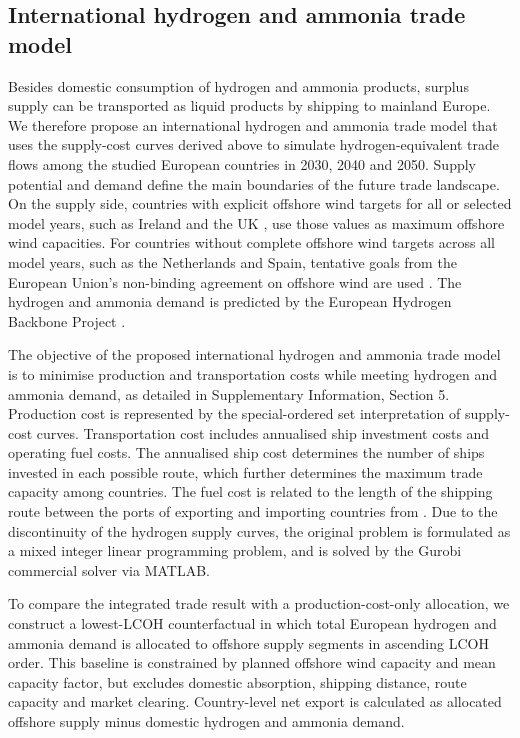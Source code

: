 \documentclass[pdflatex,lineno,sn-mathphys,Numbered]{sn-jnl}%
\begin{document}
\subsection{International hydrogen and ammonia trade model}
Besides domestic consumption of hydrogen and ammonia products, surplus supply can be transported as liquid products by shipping to mainland Europe. We therefore propose an international hydrogen and ammonia trade model that uses the supply-cost curves derived above to simulate hydrogen-equivalent trade flows among the studied European countries in 2030, 2040 and 2050. Supply potential and demand define the main boundaries of the future trade landscape. On the supply side, countries with explicit offshore wind targets for all or selected model years, such as Ireland \cite{FutureFrameworkforOffshore} and the UK \cite{Offshorewindnet}, use those values as maximum offshore wind capacities. For countries without complete offshore wind targets across all model years, such as the Netherlands and Spain, tentative goals from the European Union's non-binding agreement on offshore wind are used \cite{Offshorerenewableenergy}.
The hydrogen and ammonia demand is predicted by the European Hydrogen Backbone Project \cite{Analysingfuturedemand}.

The objective of the proposed international hydrogen and ammonia trade model is to minimise production and transportation costs while meeting hydrogen and ammonia demand, as detailed in Supplementary Information, Section 5. Production cost is represented by the special-ordered set interpretation of supply-cost curves. Transportation cost includes annualised ship investment costs and operating fuel costs. The annualised ship cost determines the number of ships invested in each possible route, which further determines the maximum trade capacity among countries.
The fuel cost is related to the length of the shipping route between the ports of exporting and importing countries from \cite{EMODnet}.
Due to the discontinuity of the hydrogen supply curves, the original problem is formulated as a mixed integer linear programming problem, and
is solved by the Gurobi commercial solver via MATLAB.

To compare the integrated trade result with a production-cost-only allocation, we construct a lowest-LCOH counterfactual in which total European hydrogen and ammonia demand is allocated to offshore supply segments in ascending LCOH order. This baseline is constrained by planned offshore wind capacity and mean capacity factor, but excludes domestic absorption, shipping distance, route capacity and market clearing. Country-level net export is calculated as allocated offshore supply minus domestic hydrogen and ammonia demand.
\end{document}
